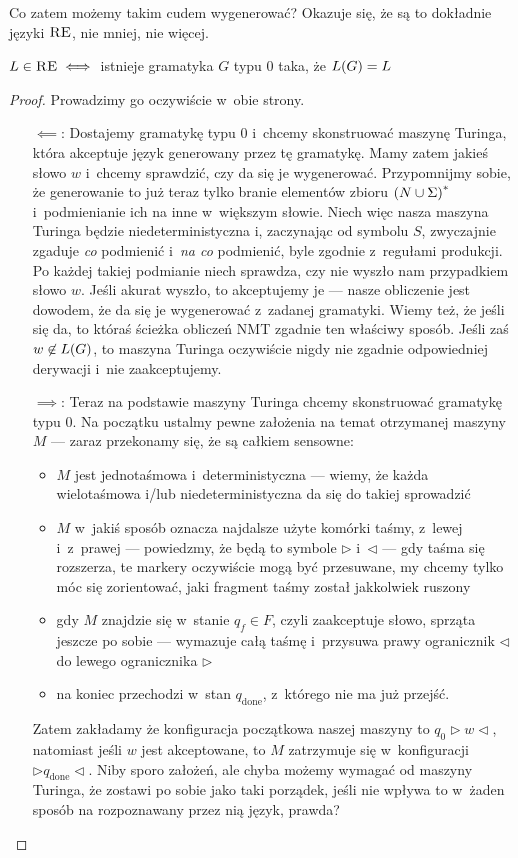 Co zatem możemy takim cudem wygenerować? Okazuje się, że są to dokładnie języki \(\textsc{RE}\), nie mniej, nie więcej.
\begin{theorem}
	\(L \in \textsc{RE} \iff\) istnieje gramatyka \(G\) typu 0 taka, że \(L\pars{G} = L\)
\end{theorem}
\begin{proof}
	Prowadzimy go oczywiście w~obie strony.
	\begin{itemize}
		\item[\(\impliedby\):] Dostajemy gramatykę typu 0 i~chcemy skonstruować maszynę Turinga, która akceptuje język generowany przez tę gramatykę. Mamy zatem jakieś słowo \(w\) i~chcemy sprawdzić, czy da się je wygenerować. Przypomnijmy sobie, że generowanie to już teraz tylko branie elementów zbioru \(\left(N \cup \Sigma\right)^*\) i~podmienianie ich na inne w~większym słowie. Niech więc nasza maszyna Turinga będzie niedeterministyczna i, zaczynając od symbolu \(S\), zwyczajnie zgaduje \emph{co} podmienić i~\emph{na co} podmienić, byle zgodnie z~regułami produkcji. Po każdej takiej podmianie niech sprawdza, czy nie wyszło nam przypadkiem słowo \(w\). Jeśli akurat wyszło, to akceptujemy je --- nasze obliczenie jest dowodem, że da się je wygenerować z~zadanej gramatyki. Wiemy też, że jeśli się da, to któraś ścieżka obliczeń NMT zgadnie ten właściwy sposób. Jeśli zaś \(w \not\in L\pars{G}\), to maszyna Turinga oczywiście nigdy nie zgadnie odpowiedniej derywacji i~nie zaakceptujemy.
		\item[\(\implies\):] Teraz na podstawie maszyny Turinga chcemy skonstruować gramatykę typu 0. Na początku ustalmy pewne założenia na temat otrzymanej maszyny \(M\) --- zaraz przekonamy się, że są całkiem sensowne:
		      \begin{itemize}
			      \item \(M\) jest jednotaśmowa i~deterministyczna --- wiemy, że każda wielotaśmowa i/lub niedeterministyczna da się do takiej sprowadzić
			      \item \(M\) w~jakiś sposób oznacza najdalsze użyte komórki taśmy, z~lewej i~z~prawej --- powiedzmy, że będą to symbole \(\triangleright\) i~\(\triangleleft\) --- gdy taśma się rozszerza, te markery oczywiście mogą być przesuwane, my chcemy tylko móc się zorientować, jaki fragment taśmy został jakkolwiek ruszony
			      \item gdy \(M\) znajdzie się w~stanie \(q_f \in F\), czyli zaakceptuje słowo, sprząta jeszcze po sobie --- wymazuje całą taśmę i~przysuwa prawy ogranicznik \(\triangleleft\) do lewego ogranicznika \(\triangleright\)
			      \item na koniec przechodzi w~stan \(q_\textrm{done}\), z~którego nie ma już przejść.
		      \end{itemize}
		      Zatem zakładamy że konfiguracja początkowa naszej maszyny to \(q_0\triangleright w\triangleleft\), natomiast jeśli \(w\) jest akceptowane, to \(M\) zatrzymuje się w~konfiguracji \(\triangleright q_\textrm{done}\triangleleft\). Niby sporo założeń, ale chyba możemy wymagać od maszyny Turinga, że zostawi po sobie jako taki porządek, jeśli nie wpływa to w~żaden sposób na rozpoznawany przez nią język, prawda?


\end{itemize}
\end{proof}
